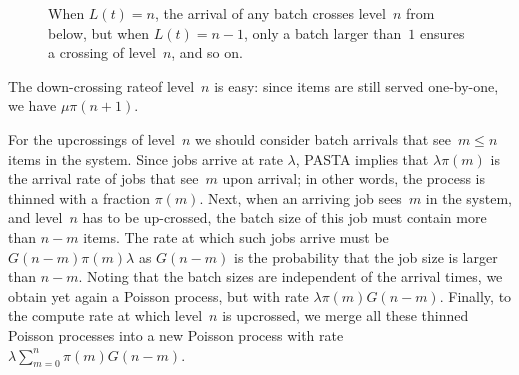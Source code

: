 \documentclass[stochastic-or.tex]{subfiles}
\begin{document}
\begin{figure}[t]
\centering
{}

\caption{When $L(t)=n$, the arrival of any batch crosses level~$n$ from below, but when $L(t)=n-1$, only a batch larger than~$1$ ensures a crossing of level~$n$, and so on.} \label{fig:levelcrossing}
\end{figure}

The down-crossing rateof level~$n$ is easy: since items are still served one-by-one, we have $\mu \pi(n+1)$.

For the upcrossings of level~$n$ we should consider batch arrivals that see~$m\leq n$ items in the system.
Since jobs arrive at rate $\lambda$, PASTA implies that $\lambda \pi(m)$ is the arrival rate of jobs that see~$m$ upon arrival; in other words, the process is thinned with a fraction $\pi(m)$.
Next, when an arriving job sees~$m$ in the system, and level~$n$ has to be up-crossed, the batch size of this job must contain more than $n-m$ items.
The rate at which such jobs arrive must be $G(n-m)\pi(m)\lambda$ as $G(n-m)$ is the probability that the job size is larger than $n-m$.
Noting that the batch sizes are independent of the arrival times, we obtain yet again a Poisson process, but with rate $\lambda \pi(m) G(n-m)$.
Finally, to the compute rate at which level~$n$ is upcrossed, we merge all these thinned Poisson processes into a new Poisson process with rate $\lambda \sum_{m=0}^n \pi(m) G(n-m)$.
\end{document}
